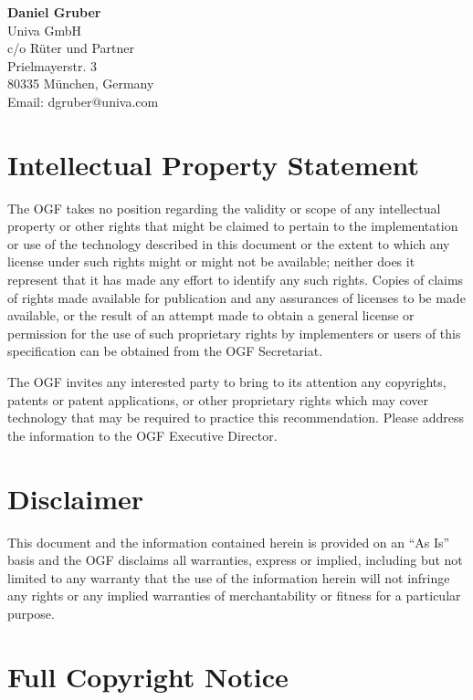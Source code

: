 \documentclass{article}
\begin{document}
\textbf{Daniel Gruber}\\
Univa GmbH\\
c/o Rüter und Partner\\
Prielmayerstr. 3\\
80335 München, Germany\\
Email: dgruber@univa.com\\


\section{Intellectual Property Statement}

 The OGF takes no position regarding the validity or scope of any
 intellectual property or other rights that might be claimed to
 pertain to the implementation or use of the technology described in
 this document or the extent to which any license under such rights
 might or might not be available; neither does it represent that it
 has made any effort to identify any such rights.  Copies of claims of
 rights made available for publication and any assurances of licenses
 to be made available, or the result of an attempt made to obtain a
 general license or permission for the use of such proprietary rights
 by implementers or users of this specification can be obtained from
 the OGF Secretariat.

 The OGF invites any interested party to bring to its attention any
 copyrights, patents or patent applications, or other proprietary
 rights which may cover technology that may be required to practice
 this recommendation.  Please address the information to the OGF
 Executive Director.


\section{Disclaimer}

 This document and the information contained herein is provided on an
 ``As Is'' basis and the OGF disclaims all warranties, express or
 implied, including but not limited to any warranty that the use of
 the information herein will not infringe any rights or any implied
 warranties of merchantability or fitness for a particular purpose.


\section{Full Copyright Notice}
\end{document}
